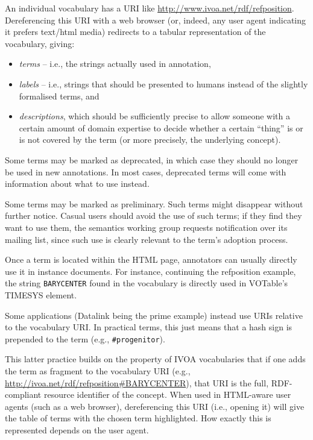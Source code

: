 \documentclass[11pt,a4paper]{ivoa}
\begin{document}
An individual vocabulary has a
URI like \url{http://www.ivoa.net/rdf/refposition}.  Dereferencing this URI
with a web browser (or, indeed, any user agent indicating it prefers
text/html media) redirects to a tabular representation of the vocabulary,
giving: 
\begin{itemize}
	\item \emph{terms} -- i.e., the strings actually used in annotation,
	\item \emph{labels} -- i.e., strings that should be presented to humans instead of
the slightly formalised terms, and 
    \item \emph{descriptions}, which should
be sufficiently precise to allow someone with a certain amount
of domain expertise to decide whether a certain ``thing'' is or is not
covered by the term (or more precisely, the underlying concept).
\end{itemize}

Some terms may be marked as deprecated, in which case they should no
longer be used in new annotations.  In most cases, deprecated terms will
come with information about what to use instead.

Some terms may be marked as preliminary.  Such terms might disappear
without further notice.  Casual users should avoid the use of such
terms; if they find they want to use them, the semantics working group
requests notification over its mailing list, since such use is clearly
relevant to the term's adoption process.

Once a term is located within the HTML page, annotators can usually
directly use it in instance documents.  For instance, continuing the
refposition example, the string \texttt{BARYCENTER} found in the
vocabulary is directly used in VOTable's TIMESYS element.  

Some applications (Datalink being the prime example) instead use URIs
relative to the vocabulary URI.  In practical terms, this just means
that a hash sign is prepended to the term (e.g., \texttt{\#progenitor}).

This latter practice builds on the property of IVOA vocabularies that if
one adds the term as fragment to the vocabulary URI (e.g.,
\url{http://ivoa.net/rdf/refposition#BARYCENTER}), that URI is the full,
RDF-compliant resource identifier of the concept.  When used in
HTML-aware user agents (such as a web browser), dereferencing this URI
(i.e., opening it) will give the table of terms with the chosen term
highlighted.  How exactly this is represented depends on the user agent.
\end{document}
